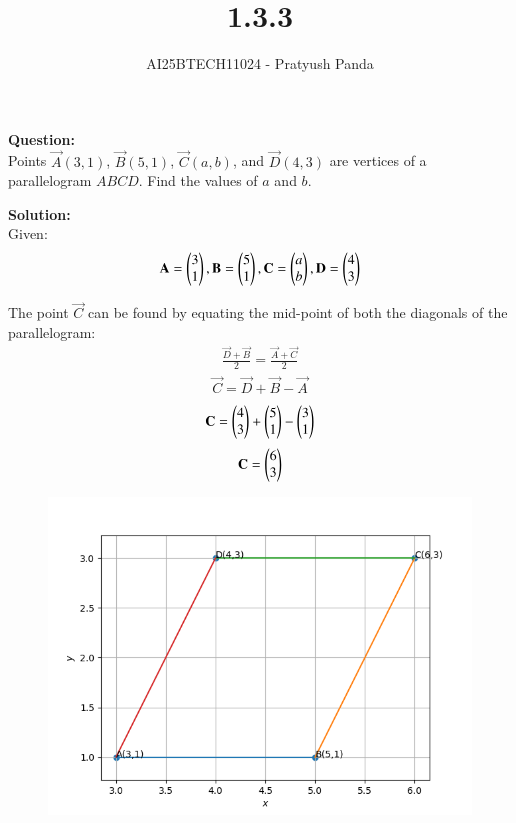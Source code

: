 \documentclass[journal]{IEEEtran}
\begin{document}

\vspace{3cm}

\title{1.3.3}
\author{AI25BTECH11024 - Pratyush Panda
}
\maketitle
{\let\newpage\relax\maketitle}

\renewcommand{\thefigure}{\theenumi}
\renewcommand{\thetable}{\theenumi}
\setlength{\intextsep}{10pt} %


\renewcommand{\thetable}{\theenumi}


\textbf{Question: }\\
Points $\vec{A}(3, 1)$, $\vec{B}(5, 1)$, $\vec{C}(a, b)$, and $\vec{D}(4, 3)$ are vertices of a parallelogram $ABCD$.
Find the values of $a$ and $b$.

\textbf{Solution: } \\
Given:
$$
\mathbf{A}=\begin{pmatrix}3 \\ 1\end{pmatrix}, \mathbf{B}=\begin{pmatrix}5 \\ 1\end{pmatrix}, \mathbf{C}=\begin{pmatrix}a \\ b\end{pmatrix}, \mathbf{D}=\begin{pmatrix}4 \\ 3\end{pmatrix}
$$

The point $\vec{C}$ can be found by equating the mid-point of both the diagonals of the parallelogram:
\begin{align}
\frac{\vec{D}+\vec{B}}{2} = \frac{\vec{A}+\vec{C}}{2} 
\end{align}
\begin{align}
\vec{C}=\vec{D}+\vec{B}-\vec{A}
\end{align}
\begin{align}
\mathbf{C}=\begin{pmatrix}4 \\ 3\end{pmatrix} + \begin{pmatrix}5 \\ 1\end{pmatrix} - \begin{pmatrix}3 \\ 1\end{pmatrix}
\end{align}
\begin{align}
\mathbf{C}=\begin{pmatrix}6 \\ 3\end{pmatrix}
\end{align}

\begin{figure}[H]
    \centering
    \includegraphics[width=0.7\columnwidth]{figs/img.png}
    \caption{}
\end{figure}
\end{document}
